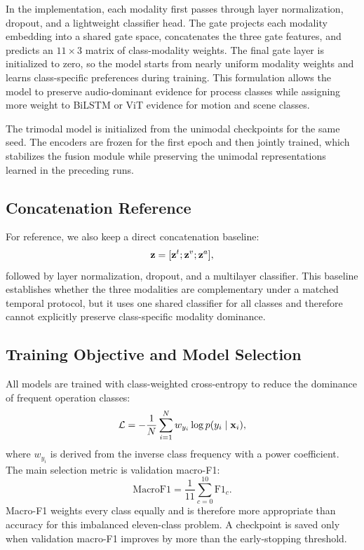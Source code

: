 In the implementation, each modality first passes through layer normalization, dropout, and a lightweight classifier head. The gate projects each modality embedding into a shared gate space, concatenates the three gate features, and predicts an $11 \times 3$ matrix of class-modality weights. The final gate layer is initialized to zero, so the model starts from nearly uniform modality weights and learns class-specific preferences during training. This formulation allows the model to preserve audio-dominant evidence for process classes while assigning more weight to BiLSTM or ViT evidence for motion and scene classes.

The trimodal model is initialized from the unimodal checkpoints for the same seed. The encoders are frozen for the first epoch and then jointly trained, which stabilizes the fusion module while preserving the unimodal representations learned in the preceding runs.

\subsection{Concatenation Reference}

For reference, we also keep a direct concatenation baseline:
\begin{equation}
    \mathbf{z} = [\mathbf{z}^{t}; \mathbf{z}^{v}; \mathbf{z}^{a}],
\end{equation}
followed by layer normalization, dropout, and a multilayer classifier. This baseline establishes whether the three modalities are complementary under a matched temporal protocol, but it uses one shared classifier for all classes and therefore cannot explicitly preserve class-specific modality dominance.

\subsection{Training Objective and Model Selection}

All models are trained with class-weighted cross-entropy to reduce the dominance of frequent operation classes:
\begin{equation}
    \mathcal{L} = -\frac{1}{N}\sum_{i=1}^{N} w_{y_i}\log p(y_i \mid \mathbf{x}_i),
\end{equation}
where $w_{y_i}$ is derived from the inverse class frequency with a power coefficient. The main selection metric is validation macro-F1:
\begin{equation}
    \mathrm{MacroF1} = \frac{1}{11}\sum_{c=0}^{10} \mathrm{F1}_{c}.
\end{equation}
Macro-F1 weights every class equally and is therefore more appropriate than accuracy for this imbalanced eleven-class problem. A checkpoint is saved only when validation macro-F1 improves by more than the early-stopping threshold.
